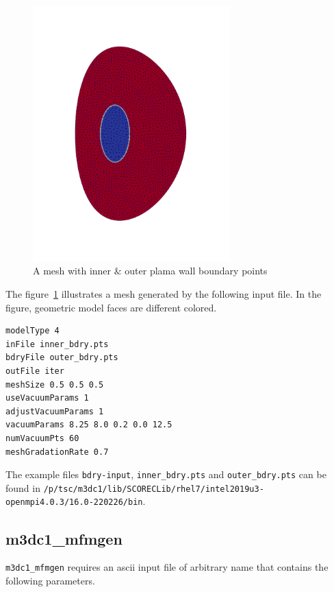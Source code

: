 \begin{figure}
\centering
\includegraphics[width=3in]{./figures/meshgen-type4.pdf}
\caption[Mesh with inner $\&$ outer plasma wall boundary points]
{A mesh with inner $\&$ outer plama wall boundary points}
\label{fig:meshgen-type4}
\end{figure}

The figure~\ref{fig:meshgen-type4} illustrates a mesh generated by the following input file. In the figure, geometric model faces are different colored.

\begin{verbatim}
modelType 4
inFile inner_bdry.pts
bdryFile outer_bdry.pts
outFile iter
meshSize 0.5 0.5 0.5
useVacuumParams 1
adjustVacuumParams 1
vacuumParams 8.25 8.0 0.2 0.0 12.5
numVacuumPts 60
meshGradationRate 0.7
\end{verbatim}

The example files \texttt{bdry-input}, \texttt{inner\_bdry.pts} and \texttt{outer\_bdry.pts} can be found in
\newline\newline
\texttt{/p/tsc/m3dc1/lib/SCORECLib/rhel7/intel2019u3-openmpi4.0.3/16.0-220226/bin}.

\subsection{m3dc1\_mfmgen}
\label{ch:mfm-gen}

\texttt{m3dc1\_mfmgen} requires an ascii input file of arbitrary name that contains the following parameters.

